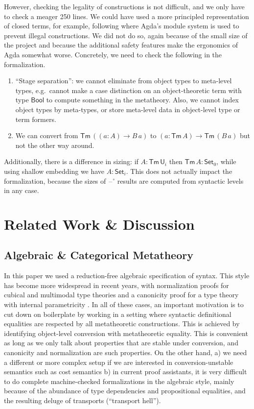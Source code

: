 \documentclass[acmsmall,screen,review,anonymous]{acmart}
\newcommand{\msf}[1]{{\mathsf{#1}}}
\newcommand{\U}{\msf{U}}
\newcommand{\Set}{\msf{Set}}
\newcommand{\blank}{{\mathord{\hspace{1pt}\text{--}\hspace{1pt}}}}
\newcommand{\Bool}{\msf{Bool}}
\newcommand{\Tm}{\msf{Tm}}
\newcommand{\w}{\circ}
\begin{document}
However, checking the legality of constructions is not difficult, and we only have to check a meager
250 lines. We could have used a more principled representation of closed terms, for example,
following \citet{DBLP:conf/mpc/KaposiKK19} where Agda's module system is used to prevent illegal
constructions. We did not do so, again because of the small size of the project and because the
additional safety features make the ergonomics of Agda somewhat worse. Concretely, we need to check
the following in the formalization.
\begin{enumerate}
\item ``Stage separation'': we cannot eliminate from object types to meta-level types, e.g.\ cannot make a case distinction
      on an object-theoretic term with type $\Bool$ to compute something in the metatheory. Also, we cannot index
      object types by meta-types, or store meta-level data in object-level type or term formers.
\item We can convert from $\Tm\,((a : A) \to B\,a)$ to $(a : \Tm\,A) \to \Tm\,(B\,a)$ but not the other way around.
\end{enumerate}
Additionally, there is a difference in sizing: if $A : \Tm\,\U_i$ then $\Tm\,A : \Set_0$, while
using shallow embedding we have $A : \Set_i$. This does not actually impact the formalization,
because the sizes of $\blank^\w$ results are computed from syntactic levels in any case.

\section{Related Work \& Discussion}

\subsection{Algebraic \& Categorical Metatheory}

In this paper we used a reduction-free algebraic specification of syntax.  This style has become
more widespread in recent years, with normalization proofs for cubical \cite{ctt-normalization} and
multimodal type theories \cite{DBLP:conf/lics/Gratzer22} and a canonicity proof for a type theory
with internal parametricity \cite{altenkirch2024internal}. In all of these cases, an important
motivation is to cut down on boilerplate by working in a setting where syntactic definitional
equalities are respected by all metatheoretic constructions. This is achieved by identifying
object-level conversion with metatheoretic equality. This is convenient as long as we only talk
about properties that are stable under conversion, and canonicity and normalization are such
properties. On the other hand, a) we need a different or more complex setup if we are interested in
conversion-unstable semantics such as cost semantics b) in current proof assistants, it is very
difficult to do complete machine-checked formalizations in the algebraic style, mainly because of
the abundance of type dependencies and propositional equalities, and the resulting deluge of
transports (``transport hell'').
\end{document}
